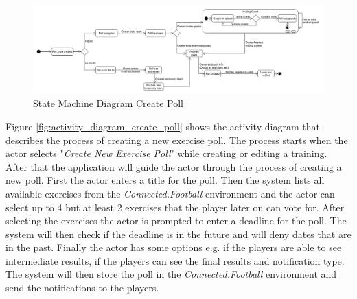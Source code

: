 \begin{figure}[H]
    \begin{center}
        \includegraphics[width=1\textwidth]{images/diagrams/state_machine_diagrams/StateDiagram_CreatePoll.png}
        \caption{State Machine Diagram Create Poll}
        \label{fig:state_machine_diagram_create_poll}
    \end{center}
\end{figure}

Figure \ref{fig:activity_diagram_create_poll} shows the activity diagram that describes the process of creating a new exercise poll. 
\newline
The process starts when the actor selects "\textit{Create New Exercise Poll}" while creating or editing a training. After that the application will guide the actor through the process of creating a new poll. First the actor enters a title for the poll. Then the system lists all available exercises from the \textit{Connected.Football} environment and the actor can select up to 4 but at least 2 exercises that the player later on can vote for. After selecting the exercises the actor is prompted to enter a deadline for the poll. The system will then check if the deadline is in the future and will deny dates that are in the past. Finally the actor has some options e.g. if the players are able to see intermediate results, if the players can see the final results and notification type. The system will then store the poll in the \textit{Connected.Football} environment and send the notifications to the players. 

